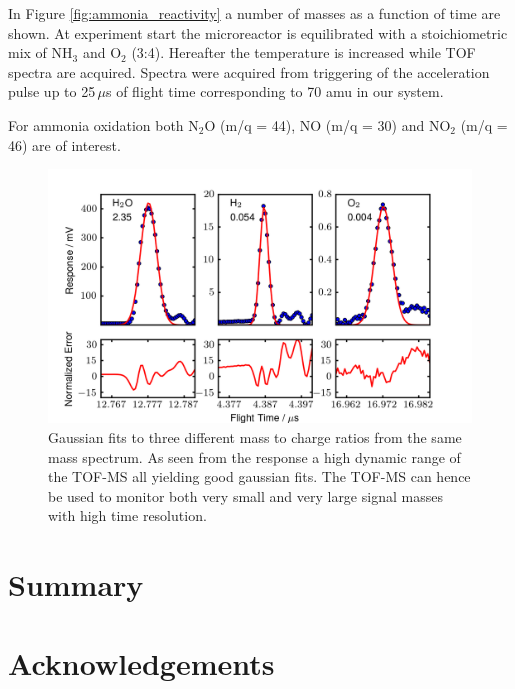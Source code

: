 \documentclass[aip,rsi]{revtex4-1}
\begin{document}
In Figure \ref{fig:ammonia_reactivity} a number of masses as a function of time are shown. At experiment start the microreactor is equilibrated with a stoichiometric mix of NH$_3$ and O$_2$ (3:4). Hereafter the temperature is increased while TOF spectra are acquired. Spectra were acquired from triggering of the acceleration pulse up to 25\,$\mu$s of flight time corresponding to 70 amu in our system. 

For ammonia oxidation both N$_2$O (m/q = 44), NO (m/q = 30) and NO$_2$ (m/q = 46) are of interest. 

\begin{figure}
 \includegraphics[width=14cm]{dynamic_range.png}%
 \caption{Gaussian fits to three different mass to charge ratios from the same mass spectrum. As seen from the response a high dynamic range of the TOF-MS all yielding good gaussian fits. The TOF-MS can hence be used to monitor both very small and very large signal masses with high time resolution.\label{fig:dynamic_range}}%
\end{figure}

\section{Summary}

\section{Acknowledgements}

\end{document}
